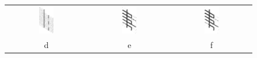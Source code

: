 \documentclass[9pt]{beamer}
\begin{document}
\begin{frame}
\begin{columns}
\begin{figure}
\begin{tabular}{c c  c }
\includegraphics[width=0.20\textwidth]{stat2dmultiR.eps}&\includegraphics[width=0.20\textwidth]{T3_9}&\includegraphics[width=0.20\textwidth]{T13_9rot}\\
d & e & f\\


\end{tabular}
\end{figure}
\end{columns}
\end{frame}
\end{document}
